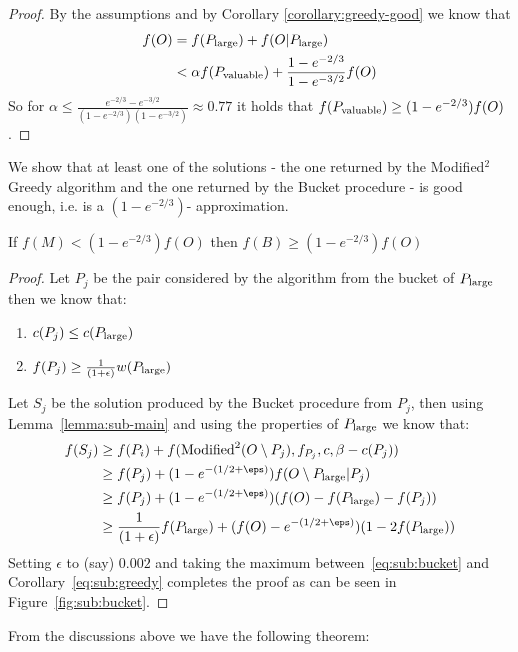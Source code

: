 \begin{proof}
	By the assumptions and by Corollary \ref{corollary:greedy-good} we know that 
	\begin{align}
		f(O)	& = f(P_{\text{large}}) + f(O|P_{\text{large}}) 
		\\ 		& < \alpha f(P_{\text{valuable}}) + \frac{1-e^{-2/3}}{1-e^{-3/2}}f(O)
	\end{align}
	So for $\alpha \leq \frac{e^{-2/3} - e^{-3/2}}{(1-e^{-2/3})(1-e^{-3/2})} \approx 0.77$ it holds that $f(P_{\text{valuable}}) \geq (1 - e^{-2/3})f(O)$.
\end{proof}

We show that at least one of the solutions - the one returned by the Modified$^2$ Greedy algorithm and the one returned by the Bucket procedure - is good enough, i.e. is a $(1 - e^{-2/3})$- approximation.

\begin{lemma}
	\label{lemma:mmgreedy-or-bucket}
	If $f(M) < (1 - e^{-2/3})f(O)$ then $f(B) \geq (1 - e^{-2/3})f(O)$
\end{lemma}

\begin{proof}
	Let $P_j$ be the pair considered by the algorithm from the bucket of $P_{\text{large}}$ then we know that:
	\begin{enumerate}
		\item $c(P_j) \leq c(P_{\text{large}})$
		\item $f(P_j) \geq \frac{1}{(1 + \epsilon)}w(P_{\text{large}})$
	\end{enumerate}
	Let $S_{j}$ be the solution produced by the Bucket procedure from $P_j$,
	then using Lemma~\ref{lemma:sub-main} and using the properties of $P_{\text{large}}$ we know that:
	\begin{align}
		f(S_{j}) 
		&
		\geq f(P_i) + f(\text{Modified}^2(O \setminus P_j), f_{P_j}, c, \beta - c(P_j))
		\\ & 
		\geq f(P_j) + (1-e^{-(1/2 + \eps)})f(O \setminus \pLarge | P_j)
		\\ & 
		\geq f(P_j) + (1-e^{-(1/2 + \eps)})(f(O) - f(\pLarge) - f(P_j))
		\\ & 
		\geq \frac{1}{(1 + \epsilon)}f(\pLarge) + (f(O)-e^{-(1/2 + \eps)})(1 - 2f(\pLarge))
		\label{eq:sub:bucket}
	\end{align}
	Setting $\epsilon$ to (say) $0.002$ and taking the maximum between~\ref{eq:sub:bucket} and Corollary~\ref{eq:sub:greedy} completes the proof as can be seen in Figure~\ref{fig:sub:bucket}.
\end{proof}

From the discussions above we have the following theorem:


